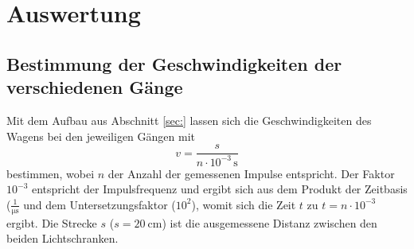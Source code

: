 \section{Auswertung}
\label{sec:Auswertung}
\FloatBarrier
\subsection{Bestimmung der Geschwindigkeiten der verschiedenen Gänge}
Mit dem Aufbau aus Abschnitt \ref{sec:} lassen sich die Geschwindigkeiten des Wagens bei den 
jeweiligen Gängen mit
\begin{equation}
	v = \frac{s}{n \cdot 10^{-3} \,\si{\second}} 
\end{equation}
bestimmen, wobei $n$ der Anzahl der gemessenen Impulse entspricht.
Der Faktor $10^{-3}$ entspricht der Impulsfrequenz und ergibt sich aus dem Produkt der
Zeitbasis ($\frac{1}{\si{\micro\second}}$ und dem Untersetzungsfaktor ($10^2$), womit sich
die Zeit $t$ zu $t = n \cdot 10^{-3}$ ergibt.
Die Strecke $s$ ($s = \SI{20}{\centi\meter}$) ist die ausgemessene Distanz zwischen den beiden
Lichtschranken.

